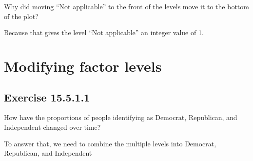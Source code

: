 \documentclass[]{book}
\newenvironment{Shaded}{\begin{snugshade}}{\end{snugshade}}
\newcommand{\CommentTok}[1]{\textcolor[rgb]{0.56,0.35,0.01}{\textit{#1}}}
\newcommand{\KeywordTok}[1]{\textcolor[rgb]{0.13,0.29,0.53}{\textbf{#1}}}
\newcommand{\NormalTok}[1]{#1}
\newcommand{\OperatorTok}[1]{\textcolor[rgb]{0.81,0.36,0.00}{\textbf{#1}}}
\theoremstyle{plain}
\theoremstyle{remark}
\begin{document}
Why did moving ``Not applicable'' to the front of the levels move it to the bottom of the plot?

Because that gives the level ``Not applicable'' an integer value of 1.

\hypertarget{modifying-factor-levels}{%
\section{Modifying factor levels}\label{modifying-factor-levels}}

\hypertarget{exercise-15.5.1.1}{%
\subsection*{\texorpdfstring{Exercise {15.5.1.1}}{Exercise 15.5.1.1}}\label{exercise-15.5.1.1}}

How have the proportions of people identifying as Democrat, Republican, and Independent changed over time?

To answer that, we need to combine the multiple levels into Democrat, Republican, and Independent

\begin{Shaded}
\end{Shaded}
\end{document}
